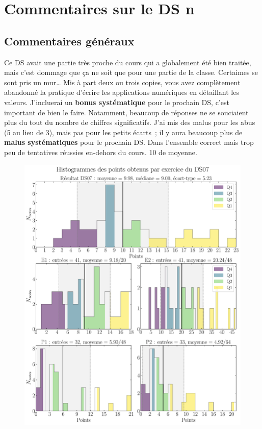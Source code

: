 \documentclass[a4paper, 10pt, final, garamond]{book}
\begin{document}
\setcounter{chapter}{6}

\chapter{Commentaires sur le DS n}
\section{Commentaires généraux}

Ce DS avait une partie très proche du cours qui a globalement été bien traitée,
mais c'est dommage que ça ne soit que pour une partie de la classe. Certaimes se
sont pris un mur…
\smallbreak
Mis à part deux ou trois copies, vous avez complètement abandonné la pratique
d'écrire les applications numériques en détaillant les valeurs. J'incluerai un
\textbf{bonus systématique} pour le prochain DS, c'est important de bien le
faire. Notamment, beaucoup de réponses ne se souciaient plus du tout du nombre
de chiffres significatifs. J'ai mis des malus pour les abus (5 au lieu de 3),
mais pas pour les petits écarts~; il y aura beaucoup plus de \textbf{malus
systématiques} pour le prochain DS.
\smallbreak
Dans l'ensemble correct mais trop peu de tentatives réussies en-dehors du cours.
10 de moyenne.

\begin{figure}[htbp!]
	\centering
	\includegraphics[width=.8\linewidth]{DS07_hist_all}
\end{figure}
\end{document}
